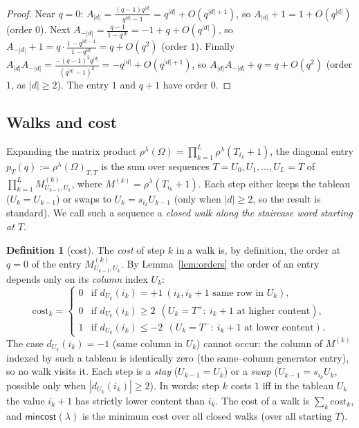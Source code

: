 \documentclass[11pt]{article}
\theoremstyle{definition}
\newtheorem{definition}[theorem]{Definition}
\begin{document}
\begin{proof}
Near $q=0$: $A_{|d|}=\frac{(q-1)q^{|d|}}{q^{|d|}-1}=q^{|d|}+O(q^{|d|+1})$, so
$A_{|d|}+1=1+O(q^{|d|})$ (order $0$). Next
$A_{-|d|}=\frac{q-1}{1-q^{|d|}}=-1+q+O(q^{|d|})$, so
$A_{-|d|}+1=q\cdot\frac{1-q^{|d|-1}}{1-q^{|d|}}=q+O(q^{2})$ (order $1$).
Finally $A_{|d|}A_{-|d|}=\frac{-(q-1)^2q^{|d|}}{(q^{|d|}-1)^2}=-q^{|d|}+O(q^{|d|+1})$,
so $A_{|d|}A_{-|d|}+q=q+O(q^{2})$ (order $1$, as $|d|\ge2$). The entry $1$ and
$q+1$ have order $0$.
\end{proof}

\subsection{Walks and cost}
Expanding the matrix product
$\rho^\lambda(\Omega)=\prod_{k=1}^{L}\rho^\lambda(T_{i_k}+1)$, the diagonal
entry $p_T(q):=\rho^\lambda(\Omega)_{T,T}$ is the sum over sequences
$T=U_0,U_1,\dots,U_L=T$ of $\prod_{k=1}^{L}M^{(k)}_{U_{k-1},U_k}$, where
$M^{(k)}=\rho^\lambda(T_{i_k}+1)$. Each step either keeps the tableau
($U_k=U_{k-1}$) or swaps to $U_k=s_{i_k}U_{k-1}$ (only when $|d|\ge2$, so the
result is standard). We call such a sequence a \emph{closed walk along the
staircase word starting at $T$}.

\begin{definition}[cost]\label{def:cost}
The \emph{cost} of step $k$ in a walk is, by definition, the order at $q=0$ of
the entry $M^{(k)}_{U_{k-1},U_k}$. By Lemma~\ref{lem:orders} the order of an
entry depends only on its \emph{column} index $U_k$:
\[
\text{cost}_k=
\begin{cases}
0 & \text{if } d_{U_k}(i_k)=+1\ (\text{$i_k,i_k{+}1$ same row in }U_k),\\
0 & \text{if } d_{U_k}(i_k)\ge2\ \ (U_k=T^+:\ i_k{+}1\text{ at higher content}),\\
1 & \text{if } d_{U_k}(i_k)\le-2\ \ (U_k=T^-:\ i_k{+}1\text{ at lower content}).
\end{cases}
\]
The case $d_{U_k}(i_k)=-1$ (same column in $U_k$) cannot occur: the column of
$M^{(k)}$ indexed by such a tableau is identically zero (the same--column
generator entry), so no walk visits it. Each step is a \emph{stay}
($U_{k-1}=U_k$) or a \emph{swap} ($U_{k-1}=s_{i_k}U_k$, possible only when
$|d_{U_k}(i_k)|\ge2$). In words: step $k$ costs $1$ iff in the tableau
$U_k$ the value $i_k{+}1$ has strictly lower content than $i_k$. The cost of a
walk is $\sum_k\text{cost}_k$, and $\mathsf{mincost}(\lambda)$ is the minimum
cost over all closed walks (over all starting $T$).
\end{definition}
\end{document}
